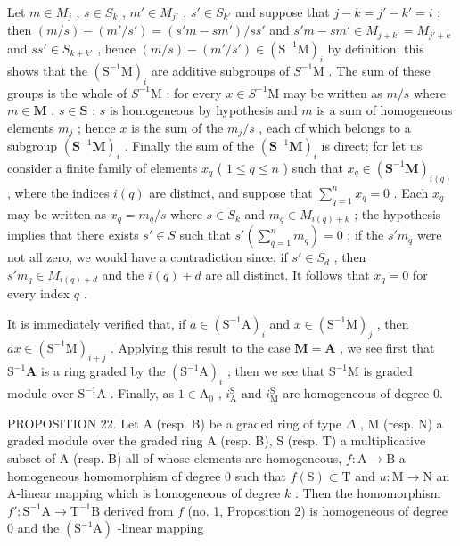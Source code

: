 Let \(m \in M_j\) , \(s \in S_k\) , \(m' \in M_{j'}\) , \(s' \in S_{k'}\) and suppose that \(j - k = j' - k' = i\) ; then \((m/s) - (m'/s') = (s'm - sm')/ss'\) and \(s'm - sm' \in M_{j+k'} = M_{j'+k}\) and \(ss' \in S_{k+k'}\) , hence \((m/s) - (m'/s') \in (\mathrm{S}^{-1}\mathrm{M})_i\) by definition; this shows that the \((\mathrm{S}^{-1}\mathrm{M})_i\) are additive subgroups of \(S^{-1}\mathrm{M}\) . The sum of these groups is the whole of \(S^{-1}\mathrm{M}\) : for every \(x \in S^{-1}\mathrm{M}\) may be written as \(m/s\) where \(m \in \mathbf{M}\) , \(s \in \mathbf{S}\) ; \(s\) is homogeneous by hypothesis and \(m\) is a sum of homogeneous elements \(m_j\) ; hence \(x\) is the sum of the \(m_j / s\) , each of which belongs to a subgroup \((\mathbf{S}^{-1}\mathbf{M})_i\) . Finally the sum of the \((\mathbf{S}^{-1}\mathbf{M})_i\) is direct; for let us consider a finite family of elements \(x_q\) ( \(1 \leqslant q \leqslant n\) ) such that \(x_q \in (\mathbf{S}^{-1}\mathbf{M})_{i(q)}\) , where the indices \(i(q)\) are distinct, and suppose that \(\sum_{q=1}^{n} x_q = 0\) . Each \(x_q\) may be written as \(x_q = m_q / s\) where \(s \in S_k\) and \(m_q \in M_{i(q)+k}\) ; the hypothesis implies that there exists \(s' \in S\) such that \(s'\left(\sum_{q=1}^{n} m_q\right) = 0\) ; if the \(s'm_q\) were not all zero, we would have a contradiction since, if \(s' \in S_d\) , then \(s'm_q \in M_{i(q)+d}\) and the \(i(q) + d\) are all distinct. It follows that \(x_q = 0\) for every index \(q\) .

It is immediately verified that, if \(a \in (\mathrm{S}^{-1}\mathrm{A})_i\) and \(x \in (\mathrm{S}^{-1}\mathrm{M})_j\) , then \(ax \in (\mathrm{S}^{-1}\mathrm{M})_{i+j}\) . Applying this result to the case \(\mathbf{M} = \mathbf{A}\) , we see first that \(\mathrm{S}^{-1}\mathbf{A}\) is a ring graded by the \((\mathrm{S}^{-1}\mathrm{A})_i\) ; then we see that \(\mathrm{S}^{-1}\mathrm{M}\) is graded module over \(\mathrm{S}^{-1}\mathrm{A}\) . Finally, as \(1 \in \mathrm{A}_0\) , \(i_{\mathrm{A}}^{\mathrm{S}}\) and \(i_{\mathrm{M}}^{\mathrm{S}}\) are homogeneous of degree 0.

PROPOSITION 22. Let A (resp. B) be a graded ring of type \(\Delta\) , M (resp. N) a graded module over the graded ring A (resp. B), S (resp. T) a multiplicative subset of A (resp. B) all of whose elements are homogeneous, \(f: \mathrm{A} \to \mathrm{B}\) a homogeneous homomorphism of degree 0 such that \(f(\mathrm{S}) \subset \mathrm{T}\) and \(u: \mathrm{M} \to \mathrm{N}\) an A-linear mapping which is homogeneous of degree \(k\) . Then the homomorphism \(f': \mathrm{S}^{-1}\mathrm{A} \to \mathrm{T}^{-1}\mathrm{B}\) derived from \(f\) (no. 1, Proposition 2) is homogeneous of degree 0 and the \((\mathrm{S}^{-1}\mathrm{A})\) -linear mapping

